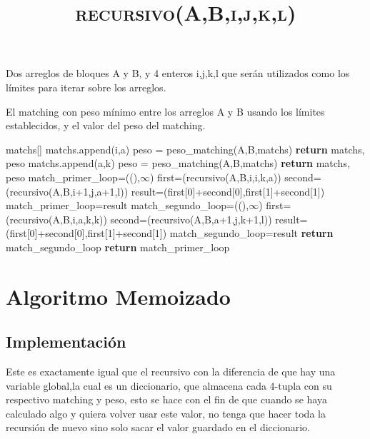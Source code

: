 \documentclass{article}
\begin{document}
\begin{algorithmic}[1]

\Require Dos arreglos de bloques A y B, y 4 enteros i,j,k,l que serán utilizados como los límites para iterar sobre los arreglos. 

\Ensure El matching con peso mínimo entre los arreglos A y B usando los límites establecidos, y el valor del peso del matching.

\title{\textsc{recursivo(A,B,i,j,k,l)}}
\State matchs[]
\State matchs.append(i,a)
\EndFor
\State peso = peso\_matching(A,B,matchs)
\State \textbf{return} matchs, peso
\EndIf
\State 
{}
\State matchs.append(a,k)
\EndFor
\State peso = peso\_matching(A,B,matchs)
\State \textbf{return} matchs, peso
\EndIf
\State
\State match\_primer\_loop=((),$\infty$)
\State first=(recursivo(A,B,i,i,k,a))
\State second=(recursivo(A,B,i+1,j,a+1,l))
\State result=(first[0]+second[0],first[1]+second[1])
\State match\_primer\_loop=result
\EndIf
\EndFor
\State
\State match\_segundo\_loop=((),$\infty$)
\State first=(recursivo(A,B,i,a,k,k))
\State second=(recursivo(A,B,a+1,j,k+1,l))
\State result=(first[0]+second[0],first[1]+second[1])
\State match\_segundo\_loop=result
\EndIf
\EndFor
\State
{}
\State \textbf{return} match\_segundo\_loop
\EndIf
\State \textbf{return} match\_primer\_loop

\end{algorithmic}








\section{Algoritmo Memoizado}
\subsection{Implementación}

Este es exactamente igual que el recursivo con la diferencia de que hay una variable global,la cual es un diccionario, que almacena cada 4-tupla con su respectivo matching y peso, esto se hace con el fin de que cuando se haya calculado algo y quiera volver usar este valor, no tenga que hacer toda la recursión de nuevo sino solo sacar el valor guardado en el diccionario.
\end{document}
